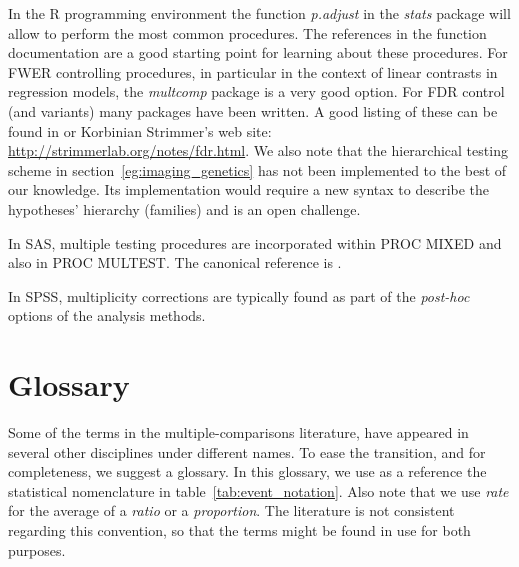 \documentclass[review,12pt]{article}
\begin{document}
In the R programming environment \citep{r_development_core_team_r:_2011} the function \emph{p.adjust} in the \emph{stats} package will allow to perform the most common procedures. The references in the function documentation are a good starting point for learning about these procedures. 
For FWER controlling procedures, in particular in the context of linear contrasts in regression models, the \emph{multcomp} package is a very good option. 
For FDR control (and variants) many packages have been written. A good listing of these can be found in \citet{bretz_multiple_2010} or Korbinian Strimmer's web site: \url{http://strimmerlab.org/notes/fdr.html}. 
We also note that the hierarchical testing scheme in section~\ref{eg:imaging_genetics} has not been implemented to the best of our knowledge. Its implementation would require a new syntax to describe the hypotheses' hierarchy (families) and is an open challenge. 

In SAS, multiple testing procedures are incorporated within PROC MIXED and also in PROC MULTEST.  The canonical reference is \citet{westfall_multiple_2011}. 

In SPSS, multiplicity corrections are typically found as part of the \emph{post-hoc} options of the analysis methods.



\section{\label{sec:glossary} Glossary}
Some of the terms in the multiple-comparisons literature, have appeared in several other disciplines under different names. To ease the transition, and for completeness, we suggest a glossary. 
In this glossary, we use as a reference the statistical nomenclature in table~\ref{tab:event_notation}. Also note that we use \emph{rate} for the average of a \emph{ratio} or a \emph{proportion}. The literature is not consistent regarding this convention, so that the terms might be found in use for both purposes.

\end{document}
